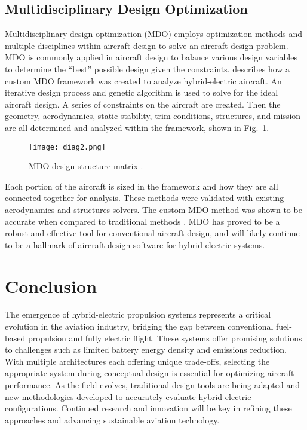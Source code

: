 \documentclass[journal]{new-aiaa}
\begin{document}
\subsection{Multidisciplinary Design Optimization}
Multidisciplinary design optimization (MDO) employs optimization methods and multiple disciplines within aircraft design to
solve an aircraft design problem. MDO is commonly applied in aircraft design to balance various design variables to
determine the ``best'' possible design given the constraints. \citeauthor{silva2021} describes how a custom MDO
framework was created to analyze hybrid-electric aircraft. An iterative design process and genetic algorithm is used to
solve for the ideal aircraft design. A series of constraints on the aircraft are created. Then the geometry,
aerodynamics, static stability, trim conditions, structures, and mission are all determined and analyzed within the
framework, shown in Fig.~\ref{fig:diag2}.
\begin{figure}
    \centering
    \texttt{[image: diag2.png]}
    \caption{MDO design structure matrix \cite{silva2021}.}
    \label{fig:diag2}
\end{figure}
Each portion of the aircraft is sized in the framework and how they are
all connected together for analysis. These methods were validated with existing aerodynamics and structures solvers. The
custom MDO method was shown to be accurate when compared to traditional methods \cite{silva2021}. MDO has proved to be a
robust and effective tool for conventional aircraft design, and will likely continue to be a hallmark of aircraft design
software for hybrid-electric systems.

\section{Conclusion}
The emergence of hybrid-electric propulsion systems represents a critical evolution in the aviation industry, bridging
the gap between conventional fuel-based propulsion and fully electric flight. These systems offer promising solutions to
challenges such as limited battery energy density and emissions reduction. With multiple architectures each offering
unique trade-offs, selecting the appropriate system during conceptual design is
essential for optimizing aircraft performance. As the field evolves, traditional design tools are being adapted and new
methodologies developed to accurately evaluate hybrid-electric configurations. Continued research and innovation will be
key in refining these approaches and advancing sustainable aviation technology.


\end{document}
